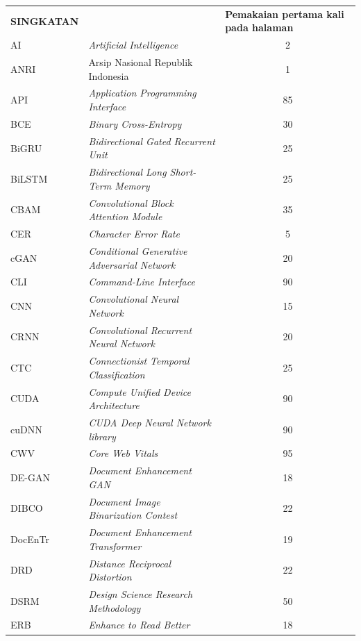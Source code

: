 \documentclass[12pt,a4paper]{article}
\begin{document}
\begin{longtable}{@{} l >{\raggedright\arraybackslash}p{7.5cm} c @{}}
\multicolumn{1}{l}{\textbf{SINGKATAN}} & \multicolumn{1}{l}{\textbf{Nama}} & \multicolumn{1}{l}{\parbox[c]{3.5cm}{\raggedright \textbf{Pemakaian pertama kali pada halaman}}} \\


AI & \textit{Artificial Intelligence} & 2 \\
ANRI & Arsip Nasional Republik Indonesia & 1 \\
API & \textit{Application Programming Interface} & 85 \\
BCE & \textit{Binary Cross-Entropy} & 30 \\
BiGRU & \textit{Bidirectional Gated Recurrent Unit} & 25 \\
BiLSTM & \textit{Bidirectional Long Short-Term Memory} & 25 \\
CBAM & \textit{Convolutional Block Attention Module} & 35 \\
CER & \textit{Character Error Rate} & 5 \\
cGAN & \textit{Conditional Generative Adversarial Network} & 20 \\
CLI & \textit{Command-Line Interface} & 90 \\
CNN & \textit{Convolutional Neural Network} & 15 \\
CRNN & \textit{Convolutional Recurrent Neural Network} & 20 \\
CTC & \textit{Connectionist Temporal Classification} & 25 \\
CUDA & \textit{Compute Unified Device Architecture} & 90 \\
cuDNN & \textit{CUDA Deep Neural Network library} & 90 \\
CWV & \textit{Core Web Vitals} & 95 \\
DE-GAN & \textit{Document Enhancement GAN} & 18 \\
DIBCO & \textit{Document Image Binarization Contest} & 22 \\
DocEnTr & \textit{Document Enhancement Transformer} & 19 \\
DRD & \textit{Distance Reciprocal Distortion} & 22 \\
DSRM & \textit{Design Science Research Methodology} & 50 \\
ERB & \textit{Enhance to Read Better} & 18 \\

\end{longtable}
\end{document}
